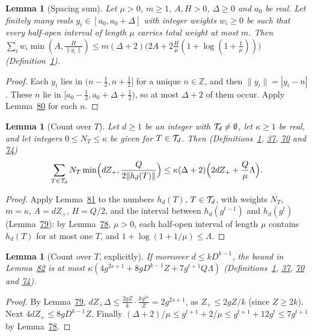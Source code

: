 \documentclass[11pt]{article}
\newcounter{hffc}
\theoremstyle{definition}\newtheorem{hffdef}[hffc]{Definition}
\theoremstyle{plain}\newtheorem{hfflem}[hffc]{Lemma}\newtheorem{hffthm}[hffc]{Theorem}
\theoremstyle{remark}\newtheorem{hffrem}[hffc]{Remark}
\newcommand{\hffcost}{}
\newcommand{\setcost}[1]{\renewcommand{\hffcost}{#1}}
\newcommand{\Z}{\mathbb{Z}}\newcommand{\R}{\mathbb{R}}\newcommand{\N}{\mathbb{N}}
\begin{document}
\begin{hfflem}[Spacing sum]\label{L:space}
Let $\mu>0$, $m\ge1$, $A,H>0$, $\Delta\ge0$ and $a_0$ be real. Let finitely many reals $y_i\in[a_0,a_0+\Delta]$ with integer weights $w_i\ge0$ be such that every half-open interval of length $\mu$ carries total weight at most $m$. Then $\sum_iw_i\min(A,\frac H{\|y_i\|})\le m(\Delta+2)\bigl(2A+2\frac H\mu(1+\log(1+\frac1\mu))\bigr)$ (Definition~\hyperref[D:conv]{1}).
\par\nopagebreak{}
\end{hfflem}
\begin{proof}\setcost{length 127/300}Each $y_i$ lies in $(n-\frac12,n+\frac12]$ for a unique $n\in\Z$, and then $\|y_i\|=|y_i-n|$. These $n$ lie in $[a_0-\frac12,a_0+\Delta+\frac12)$, so at most $\Delta+2$ of them occur. Apply Lemma~\hyperref[L:space1]{80} for each $n$.
\end{proof}

\begin{hfflem}[Count over $T$]\label{L:countT}
Let $d\ge1$ be an integer with $\mathcal{T}_d\ne\emptyset$, let $\kappa\ge1$ be real, and let integers $0\le N_T\le\kappa$ be given for $T\in\mathcal{T}_d$. Then (Definitions~\hyperref[D:conv]{1}, \hyperref[D:phase]{37}, \hyperref[D:count]{70} and \hyperref[D:curve]{74}) \[\sum_{T\in\mathcal{T}_d}N_T\min\Bigl(dZ_+,\frac Q{2\|h_d(T)\|}\Bigr)\le\kappa(\Delta+2)\Bigl(2dZ_++\frac Q\mu\Lambda\Bigr).\]
\par\nopagebreak{}
\end{hfflem}
\begin{proof}\setcost{length 202/300}Apply Lemma~\hyperref[L:space]{81} to the numbers $h_d(T)$, $T\in\mathcal{T}_d$, with weights $N_T$, $m=\kappa$, $A=dZ_+$, $H=Q/2$, and the interval between $h_d(g^{t-1})$ and $h_d(g^t)$ (Lemma~\hyperref[L:range]{79}): by Lemma~\hyperref[L:gaps]{78}, $\mu>0$, each half-open interval of length $\mu$ contains $h_d(T)$ for at most one $T$, and $1+\log(1+1/\mu)\le\Lambda$.
\end{proof}

\begin{hfflem}[Count over $T$, explicitly]\label{L:countT2}
If moreover $d\le kD^{k-1}$, the bound in Lemma~\hyperref[L:countT]{82} is at most $\kappa(4g^{2s+1}+8gD^{k-1}Z+7g^{t+1}Q\Lambda)$ (Definitions~\hyperref[D:conv]{1}, \hyperref[D:phase]{37}, \hyperref[D:count]{70} and \hyperref[D:curve]{74}).
\par\nopagebreak{}
\end{hfflem}
\begin{proof}\setcost{length 121/300}By Lemma~\hyperref[L:range]{79}, $dZ_+\Delta\le\frac{2gZ}k\cdot\frac{kg^{2s}}Z=2g^{2s+1}$, as $Z_+\le2gZ/k$ (since $Z\ge2k$). Next $4dZ_+\le8gD^{k-1}Z$. Finally $(\Delta+2)/\mu\le g^{t+1}+2/\mu\le g^{t+1}+12g^t\le7g^{t+1}$ by Lemma~\hyperref[L:gaps]{78}.
\end{proof}
\end{document}
